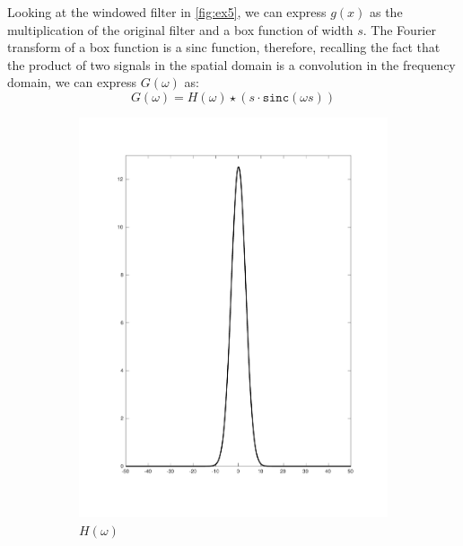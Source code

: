 \documentclass[tikz,14pt,fleqn]{article}
\begin{document}
Looking at the windowed filter in \autoref{fig:ex5}, we can express $g(x)$ as the multiplication of the original filter and a box function of width $s$. The Fourier transform of a box function is a sinc function, therefore, recalling the fact that the product of two signals in the spatial domain is a convolution in the frequency domain, we can express $G(\omega)$ as:
\begin{equation*}
    G(\omega) = H(\omega) \star (s\cdot\texttt{sinc}(\omega s))
\end{equation*}

\begin{figure}[H]
    \centering
    \begin{subfigure}{0.49\linewidth}
        \centering
        \includegraphics[width=\linewidth]{fig/5.hw.pdf}
        \caption{$H(\omega)$}
        \label{fig:ex5-Hw}
    \end{subfigure}
    \begin{subfigure}{0.49\linewidth}
        \centering

\end{subfigure}
\end{figure}
\end{document}
